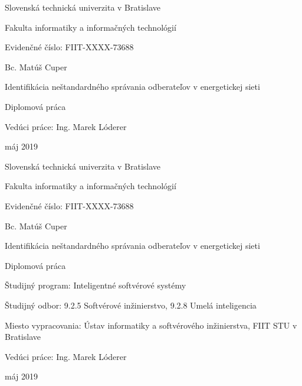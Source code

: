 \documentclass[a4paper,twoside,slovak,12pt,appendix]{article}
\begin{document}
\begin{titlepage}
	\centering
	{\Large Slovenská technická univerzita v Bratislave \par}
	{\Large Fakulta informatiky a informačných technológií \par}
  \vspace{0.5cm}
  {\normalsize Evidenčné číslo: FIIT-XXXX-73688 \par}
	\vspace{7cm}
  {\large Bc. Matúš Cuper \par}
  \vspace{0.5cm}
	{\LARGE Identifikácia neštandardného správania odberateľov v energetickej sieti \par}
	\vspace{0.5cm}
	{\large Diplomová práca \par}
	\vspace{7cm}
  \flushleft
	{\large Vedúci práce: Ing. Marek Lóderer \par}
  \vspace{0.5cm}
  {\large máj 2019 \par}
	\vfill
\end{titlepage}

\begin{titlepage}
	\centering
  {\Large Slovenská technická univerzita v Bratislave \par}
	{\Large Fakulta informatiky a informačných technológií \par}
  \vspace{0.5cm}
  {\normalsize Evidenčné číslo: FIIT-XXXX-73688 \par}
	\vspace{7cm}
  {\large Bc. Matúš Cuper \par}
  \vspace{0.5cm}
	{\LARGE Identifikácia neštandardného správania odberateľov v energetickej sieti \par}
	\vspace{0.5cm}
	{\large Diplomová práca \\}
	\vspace{7cm}
  \flushleft
  {\normalsize Študijný program: Inteligentné softvérové systémy \par}
	{\normalsize Študijný odbor: 9.2.5 Softvérové inžinierstvo, 9.2.8 Umelá inteligencia \par}
	{\normalsize Miesto vypracovania: Ústav informatiky a softvérového inžinierstva, FIIT STU v Bratislave \par}
	{\normalsize Vedúci práce: Ing. Marek Lóderer \par}
  \vspace{0.5cm}
  {\normalsize máj 2019 \par}
\end{titlepage}
\end{document}
